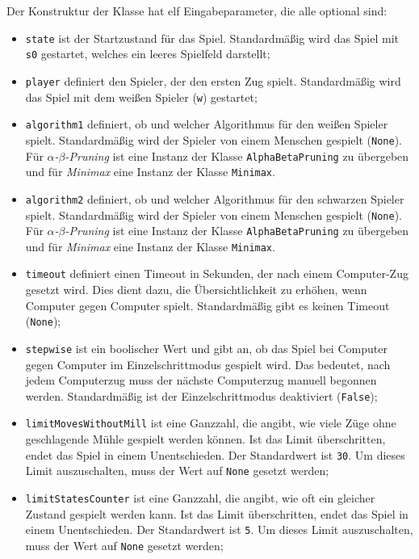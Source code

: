\documentclass[11pt]{article}
\begin{document}
Der Konstruktur der Klasse hat elf Eingabeparameter, die alle optional
sind:
\begin{itemize}
    \item \texttt{state} ist der Startzustand für das Spiel. Standardmäßig wird das Spiel mit \texttt{s0} gestartet, welches ein leeres Spielfeld darstellt;
    \item \texttt{player} definiert den Spieler, der den ersten Zug spielt. Standardmäßig wird das Spiel mit dem weißen Spieler (\texttt{w}) gestartet;
    \item \texttt{algorithm1} definiert, ob und welcher Algorithmus für den weißen Spieler spielt. Standardmäßig wird der Spieler von einem Menschen gespielt (\texttt{None}). Für \emph{$\alpha$-$\beta$-Pruning} ist eine Instanz der Klasse \texttt{AlphaBetaPruning} zu übergeben und für \emph{Minimax} eine Instanz der Klasse \texttt{Minimax}.
    \item \texttt{algorithm2} definiert, ob und welcher Algorithmus für den schwarzen Spieler spielt. Standardmäßig wird der Spieler von einem Menschen gespielt (\texttt{None}). Für \emph{$\alpha$-$\beta$-Pruning} ist eine Instanz der Klasse \texttt{AlphaBetaPruning} zu übergeben und für \emph{Minimax} eine Instanz der Klasse \texttt{Minimax}.
    \item \texttt{timeout} definiert einen Timeout in Sekunden, der nach einem Computer-Zug gesetzt wird. Dies dient dazu, die Übersichtlichkeit zu erhöhen, wenn Computer gegen Computer spielt. Standardmäßig gibt es keinen Timeout (\texttt{None});
    \item \texttt{stepwise} ist ein boolischer Wert und gibt an, ob das Spiel bei Computer gegen Computer im Einzelschrittmodus gespielt wird. Das bedeutet, nach jedem Computerzug muss der nächste Computerzug manuell begonnen werden. Standardmäßig ist der Einzelschrittmodus deaktiviert (\texttt{False});
    \item \texttt{limitMovesWithoutMill} ist eine Ganzzahl, die angibt, wie viele Züge ohne geschlagende Mühle gespielt werden können. Ist das Limit überschritten, endet das Spiel in einem Unentschieden. Der Standardwert ist \texttt{30}. Um dieses Limit auszuschalten, muss der Wert auf \texttt{None} gesetzt werden;
    \item \texttt{limitStatesCounter} ist eine Ganzzahl, die angibt, wie oft ein gleicher Zustand gespielt werden kann. Ist das Limit überschritten, endet das Spiel in einem Unentschieden. Der Standardwert ist \texttt{5}. Um dieses Limit auszuschalten, muss der Wert auf \texttt{None} gesetzt werden;

\end{itemize}
\end{document}
